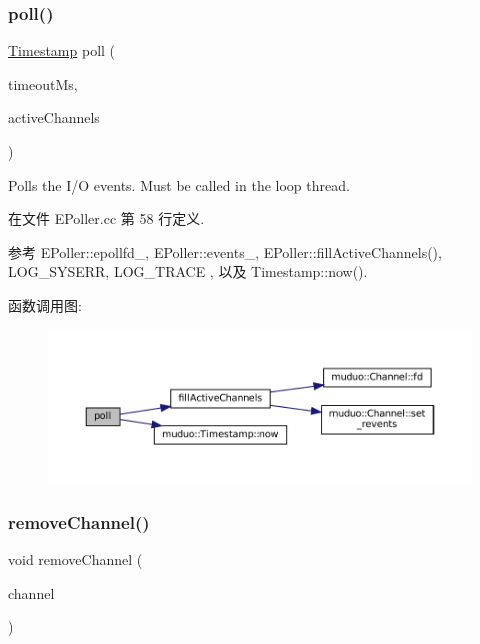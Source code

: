 \subsubsection{\texorpdfstring{poll()}{poll()}}
{\footnotesize\ttfamily \hyperlink{classmuduo_1_1Timestamp}{Timestamp} poll (\begin{DoxyParamCaption}\item[{int}]{timeout\+Ms,  }\item[{\hyperlink{classmuduo_1_1EPoller_a0b74248ffee6df294563618187b52404}{Channel\+List} $\ast$}]{active\+Channels }\end{DoxyParamCaption})}

Polls the I/O events. Must be called in the loop thread. 

在文件 E\+Poller.\+cc 第 58 行定义.



参考 E\+Poller\+::epollfd\+\_\+, E\+Poller\+::events\+\_\+, E\+Poller\+::fill\+Active\+Channels(), L\+O\+G\+\_\+\+S\+Y\+S\+E\+RR, L\+O\+G\+\_\+\+T\+R\+A\+CE , 以及 Timestamp\+::now().

函数调用图\+:
\nopagebreak
\begin{figure}[H]
\begin{center}
\leavevmode
\includegraphics[width=350pt]{classmuduo_1_1EPoller_a0165aabf2721e39f87ad67b05ece9267_cgraph}
\end{center}
\end{figure}
\mbox{\label{classmuduo_1_1EPoller_ab10f76c92cb5269f8296e5b3e4dd0ef9}} 
\subsubsection{\texorpdfstring{remove\+Channel()}{removeChannel()}}
{\footnotesize\ttfamily void remove\+Channel (\begin{DoxyParamCaption}\item[{\hyperlink{classmuduo_1_1Channel}{Channel} $\ast$}]{channel }\end{DoxyParamCaption})}

